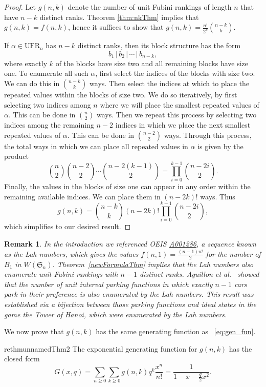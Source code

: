 \documentclass[11pt,reqno]{amsart}
\newcommand{\Sym}{\mathfrak{S}}
\newcommand{\ufr}[1]{\mathrm{UFR}_{#1}}
\newtheorem{remark}[rethm]{Remark}
\begin{document}
\begin{proof}
Let $g(n,k)$ denote the number of unit Fubini rankings of length $n$ that have $n-k$ distinct ranks. 
Theorem \ref{thm:nkThm} implies that $g(n,k)=f(n,k)$, hence it suffices to show that $g(n,k)=\frac{n!}{2^k}\binom{n-k}{k}$.

If $\alpha\in\ufr{n}$ has $n-k$ distinct ranks, then its block structure has the form
\[b_1\,|\,b_2\,|\,\cdots\,|\,b_{n-k},\]
where exactly $k$ of the blocks have size two and all remaining blocks have size one. 
To enumerate all such $\alpha$, first select the indices of the blocks with size two. 
We can do this in $\binom{n-k}{k}$ ways. 
Then select the indices at which to place the repeated values within the blocks of size two. We do so iteratively, by first selecting two indices among $n$ where we will place the smallest repeated values of $\alpha$. 
This can be done in $\binom{n}{2}$ ways.
Then we repeat this process by selecting two indices among the remaining $n-2$ indices in which we place the next smallest repeated values of $\alpha$. 
This can be done in $\binom{n-2}{2}$ ways.
Through this process, the total ways in which we can place all repeated values in $\alpha$ is given by the product 
\[\binom{n}{2}\binom{n-2}{2}\cdots \binom{n-2(k-1)}{2}=\prod_{i=0}^{k-1}\binom{n-2i}{2}.\]
Finally, the values in the blocks of size one can appear in any order within the remaining available indices. 
We can place them in $(n-2k)!$ ways. Thus
\[
g(n,k)= \binom{n-k}{k}  (n-2k)! \prod_{i=0}^{k-1}\binom{n-2i}{2},
\]
    which simplifies to our desired result.
\end{proof}

\begin{remark}
In the introduction we referenced OEIS \href{https://oeis.org/A001286}{A001286}, a sequence known as the Lah numbers, which gives the values $f(n,1)=\frac{(n-1)n!}{2}$ for the number of $B_1$ in $W(\Sym_n)$. Theorem~\ref{newFormulaThm} implies that the Lah numbers also enumerate unit Fubini rankings with $n-1$ distinct ranks. 
Aguillon et al.~\cite{aguillon2023parking} showed that the number of unit interval parking functions in which exactly $n-1$ cars park in their preference is also enumerated by the Lah numbers. 
This result was established via a bijection between those parking functions and ideal states in the game the Tower of Hanoi, which were enumerated by the Lah numbers.
\end{remark}



We now prove that $g(n,k)$ has the same generating function as ~\eqref{eq:gen_fun}.
\begin{restatable}{rethm}{unnamedThm2}
    The exponential generating function for $g(n,k)$ has the closed form
    \[
    G(x,q) = \sum_{n\geq 0} \sum_{k\geq 0} g(n,k)q^k\frac{x^n}{n!} = \frac{1}{1-x-\frac{q}{2}x^2}.
    \]
\end{restatable}
\end{document}
